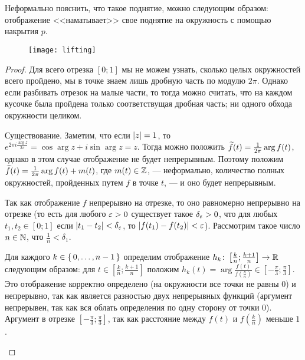 \documentclass[main]{subfiles}
\begin{document}
\resetcounters

\section{}

Неформально пояснить, что такое поднятие, можно следующим образом: отображение <<наматывает>> свое поднятие на
окружность с помощью накрытия $ p $.

\begin{figure}[H]
	\centering \texttt{[image: lifting]}
\end{figure}

\LiftExists

\begin{proof}
	Для всего отрезка $ [0; 1] $ мы не можем узнать, сколько целых окружностей всего пройдено, мы в
	точке знаем лишь дробную часть по модулю $ 2 \pi $. Однако если разбивать отрезок на малые
	части, то тогда можно считать, что на каждом кусочке была пройдена только соответствущая дробная часть;
	ни одного обхода окружности целиком.
	\begin{phased}
		\item[Существование.]
			Заметим, что если $ \left\vert z\right\vert = 1 $, то
			$ e^{2 \pi i \frac{\arg z}{2 \pi}} = \cos \arg z + i \sin \arg z = z $. Тогда можно положить
			$ \widetilde{f}(t) = \frac{1}{2 \pi} \arg f(t) $, однако в этом случае отображение не будет непрерывным.
			Поэтому положим $ \widetilde{f}(t) = \frac{1}{2 \pi} \arg f(t) + m(t) $, где $ m(t) \in \mathbb{Z} $, --- неформально,
			количество полных окружностей, пройденных путем $ f $ в точке $ t $, --- и оно будет непрерывным.

			Так как отображение $ f $ непрерывно на отрезке, то оно равномерно непрерывно на
			отрезке (то есть для любого $ \varepsilon > 0 $ существует такое $ \delta_\varepsilon > 0 $, что для любых
			$ t_1, t_2 \in [0; 1] $ если $ \left\vert t_1 - t_2\right\vert < \delta_\varepsilon $, то $ \left\vert f(t_1) - f(t_2)\right\vert < \varepsilon $).
			Рассмотрим такое число $ n \in \mathbb{N} $, что $ \frac{1}{n} < \delta_1 $.

			Для каждого
			$ k \in \left\{\,0, \ldots, n - 1\,\right\} $ определим отображение
			$ h_k \colon \left[ \frac{k}{n}; \frac{k+1}{n} \right] \to \mathbb{R} $ следующим образом: для
			$ t \in \left[ \frac{k}{n}; \frac{k+1}{n} \right] $ положим
				$ h_k(t) = \arg \frac{f(t)}{f \left( \frac{k}{n} \right)}
				\in \left[ -\frac{\pi}{3}; \frac{\pi}{3} \right] $.
			Это отображение корректно определено (на окружности все точки не равны 0) и непрерывно,
			так как является разностью двух непрерывных функций (аргумент непрерывен, так как вся облать определения
			по одну сторону от точки 0). Аргумент в отрезке $ \left[ -\frac{\pi}{3}; \frac{\pi}{3} \right] $, так как
			расстояние между $ f(t) $ и $ f \left( \frac{k}{n} \right) $ меньше $ 1 $.


\end{phased}
\end{proof}
\end{document}
